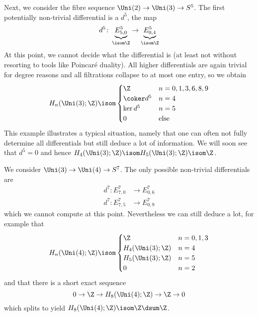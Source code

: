 \begin{example}
	Next, we consider the fibre sequence $\Uni(2) \to \Uni(3) \to S^5$.
	The first potentially non-trivial differential is a $d^5$, the map
	\begin{equation*}
		d^5\colon \underbrace{E^5_{5, 0}}_{\isom \Z} \to \underbrace{E^5_{0, 4}}_{\isom \Z}
	\end{equation*}
	At this point, we cannot decide what the differential is (at least not without resorting to tools like Poincaré duality).
	All higher differentials are again trivial for degree reasons and all filtrations collapse to at most one entry, so we obtain
	\begin{equation*}
		H_n(\Uni(3); \Z) \isom \begin{cases}
			\Z 			& n = 0, 1, 3, 6, 8, 9 \\
			\coker d^5 	& n = 4 \\
			\ker d^5 	& n = 5 \\
			0 			& \text{else}
		\end{cases}
	\end{equation*}
	This example illustrates a typical situation, namely that one can often not fully determine all differentials but still deduce a lot of information.
	We will soon see that $d^5 = 0$ and hence $H_4(\Uni(3); \Z) \isom H_5(\Uni(3); \Z) \isom \Z$.
\end{example}
\begin{example}
	We consider $\Uni(3) \to \Uni(4) \to S^7$.
	The only possible non-trivial differentials are
	\begin{align*}
		d^7\colon E^7_{7, 0} &\to E^7_{0, 6} \\
		d^7\colon E^7_{7, 5} &\to E^7_{0, 9}
	\end{align*}
	which we cannot compute at this point.
	Nevertheless we can still deduce a lot, for example that
	\begin{equation*}
		H_n(\Uni(4); \Z) \isom \begin{cases}
			\Z 					& n = 0, 1, 3 \\
			H_4(\Uni(3); \Z) 	& n = 4 \\
			H_5(\Uni(3); \Z) 	& n = 5 \\
			0 					& n = 2
		\end{cases}
	\end{equation*}
	and that there is a short exact sequence
	\begin{equation*}
		0 \to \Z \to H_8(\Uni(4); \Z) \to \Z \to 0
	\end{equation*}
	which splits to yield $H_8(\Uni(4); \Z) \isom \Z \dsum \Z$.
\end{example}

